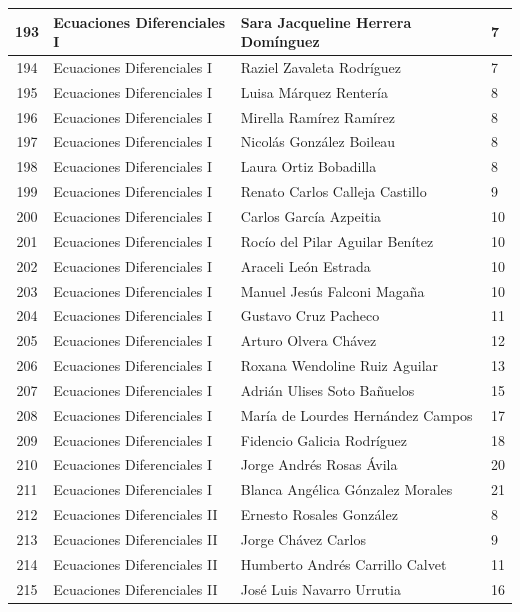 {\begin{longtable}{|c|p{6.5cm}|p{5cm}|p{1.5cm}|}
193 & Ecuaciones Diferenciales I & Sara Jacqueline Herrera Domínguez & 7 \\ \hline
194 & Ecuaciones Diferenciales I & Raziel Zavaleta Rodríguez & 7 \\ \hline
195 & Ecuaciones Diferenciales I & Luisa Márquez Rentería & 8 \\ \hline
196 & Ecuaciones Diferenciales I & Mirella Ramírez Ramírez & 8 \\ \hline
197 & Ecuaciones Diferenciales I & Nicolás González Boileau & 8 \\ \hline
198 & Ecuaciones Diferenciales I & Laura Ortiz Bobadilla & 8 \\ \hline
199 & Ecuaciones Diferenciales I & Renato Carlos Calleja Castillo & 9 \\ \hline
200 & Ecuaciones Diferenciales I & Carlos García Azpeitia & 10 \\ \hline
201 & Ecuaciones Diferenciales I & Rocío del Pilar Aguilar Benítez & 10 \\ \hline
202 & Ecuaciones Diferenciales I & Araceli León Estrada & 10 \\ \hline
203 & Ecuaciones Diferenciales I & Manuel Jesús Falconi Magaña & 10 \\ \hline
204 & Ecuaciones Diferenciales I & Gustavo Cruz Pacheco & 11 \\ \hline
205 & Ecuaciones Diferenciales I & Arturo Olvera Chávez & 12 \\ \hline
206 & Ecuaciones Diferenciales I & Roxana Wendoline Ruiz Aguilar & 13 \\ \hline
207 & Ecuaciones Diferenciales I & Adrián Ulises Soto Bañuelos & 15 \\ \hline
208 & Ecuaciones Diferenciales I & María de Lourdes Hernández Campos & 17 \\ \hline
209 & Ecuaciones Diferenciales I & Fidencio Galicia Rodríguez & 18 \\ \hline
210 & Ecuaciones Diferenciales I & Jorge Andrés Rosas Ávila & 20 \\ \hline
211 & Ecuaciones Diferenciales I & Blanca Angélica Gónzalez Morales & 21 \\ \hline
212 & Ecuaciones Diferenciales II & Ernesto Rosales González & 8 \\ \hline
213 & Ecuaciones Diferenciales II & Jorge Chávez Carlos & 9 \\ \hline
214 & Ecuaciones Diferenciales II & Humberto Andrés Carrillo Calvet & 11 \\ \hline
215 & Ecuaciones Diferenciales II & José Luis Navarro Urrutia & 16 \\ \hline

\end{longtable}}
